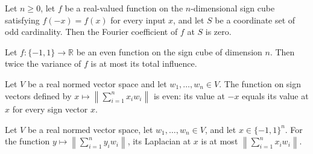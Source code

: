 \begin{theorem}
\label{FABL.fourierCoeff_eq_zero_of_even_of_odd_card}
\leanok
{}
Let $n\ge 0$, let $f$ be a real-valued function on the $n$-dimensional sign cube
satisfying $f(-x)=f(x)$ for every input $x$, and let $S$ be a coordinate set of odd
cardinality. Then the Fourier coefficient of $f$ at $S$ is zero.
\end{theorem}

\begin{theorem}
\label{FABL.two_mul_variance_le_totalInfluence_of_even}
\leanok
{}
Let $f:\{-1,1\} \to \mathbb R$ be an even function on the
sign cube of dimension $n$. Then twice the variance of $f$ is at most its total
influence.
\end{theorem}

\begin{theorem}
\label{FABL.rademacherNorm_even}
\leanok
{}
Let $V$ be a real normed vector space and let $w_1,\ldots,w_n\in V$. The function on
sign vectors defined by $x\mapsto\left\|\sum_{i=1}^n x_i w_i\right\|$ is even: its
value at $-x$ equals its value at $x$ for every sign vector $x$.
\end{theorem}

\begin{theorem}
\label{FABL.laplacian_rademacherNorm_le}
\leanok
{}
Let $V$ be a real normed vector space, let $w_1,\ldots,w_n\in V$, and let
$x\in\{-1,1\}^n$. For the function $y\mapsto\left\|\sum_{i=1}^n y_iw_i\right\|$, its
Laplacian at $x$ is at most $\left\|\sum_{i=1}^n x_iw_i\right\|$.
\end{theorem}

